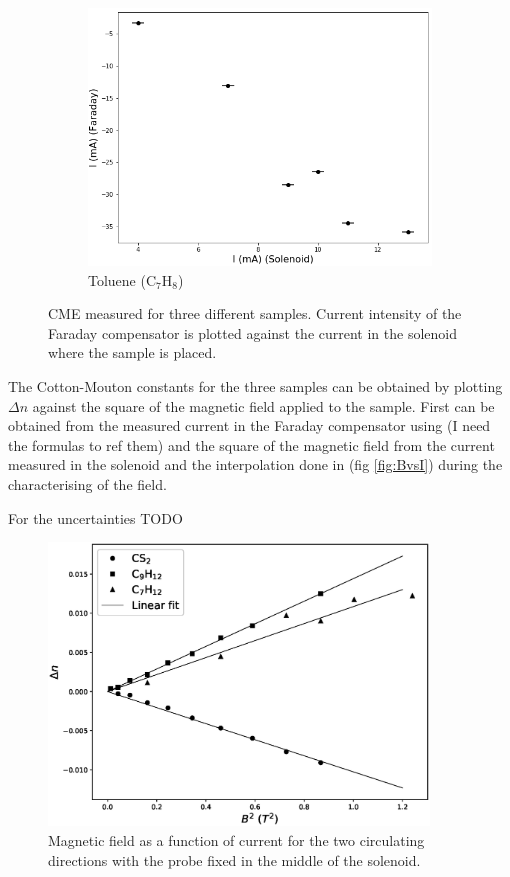 \documentclass[11pt,a4paper]{article}
\begin{document}
\begin{figure}[H]
\begin{subfigure}[b]{0.45\textwidth}
\includegraphics[width=\textwidth]{sample1}
\caption{Toluene (C$_7$H$_8$)}
\label{fig:CME_sample1}
\end{subfigure}
\caption{CME measured for three different samples. Current intensity of the Faraday compensator is plotted against the current in the solenoid where the sample is placed.}
\label{fig:CME}
\end{figure}

The Cotton-Mouton constants for the three samples can be obtained by plotting $\Delta n$ against the square of the magnetic field applied to the sample. First can be obtained from the measured current in the Faraday compensator using {\color{red}(I need the formulas to ref them)} and the square of the magnetic field from the current measured in the solenoid and the interpolation done in (fig \ref{fig:BvsI}) during the characterising of the field.

For the uncertainties {\color{red}TODO}

\begin{figure}[H]
\centering
\includegraphics[width=0.9\textwidth]{CM_consts.eps}
\caption{Magnetic field as a function of current for the two circulating directions with the probe fixed in the middle of the solenoid.}
\label{fig:CM_const}
\end{figure}
\end{document}
